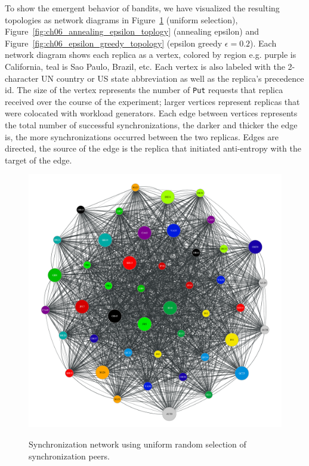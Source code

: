 To show the emergent behavior of bandits, we have visualized the resulting
topologies as network diagrams in Figure~\ref{fig:ch06_uniform_selection_topology} (uniform
selection), Figure~\ref{fig:ch06_annealing_epsilon_toplogy} (annealing epsilon) and
Figure~\ref{fig:ch06_epsilon_greedy_topology} (epsilon greedy $\epsilon=0.2$).
Each network diagram shows each replica as a vertex, colored by region e.g.
purple is California, teal is Sao Paulo, Brazil, etc.
Each vertex is also labeled with the 2-character UN country or US state
abbreviation as well as the replica's precedence id.
The size of the vertex represents the number of \texttt{Put} requests that
replica received over the course of the experiment; larger vertices
represent replicas that were colocated with workload generators.
Each edge between vertices represents the total number of successful
synchronizations, the darker and thicker the edge is, the more
synchronizations occurred between the two replicas.
Edges are directed, the source of the edge is the replica that initiated
anti-entropy with the target of the edge.

\begin{figure}
    \begin{center}
        \includegraphics[width=5in]{figures/ch06_b-uniform-selection-e1.pdf}
    \end{center}
    \renewcommand{\baselinestretch}{1}
    \small\normalsize

    \begin{quote}
        \caption[Uniform Anti-Entropy Synchronization Network]{Synchronization network using uniform random selection of synchronization peers.}
        \label{fig:ch06_uniform_selection_topology}
    \end{quote}
\end{figure}
\renewcommand{\baselinestretch}{2}
\small\normalsize

